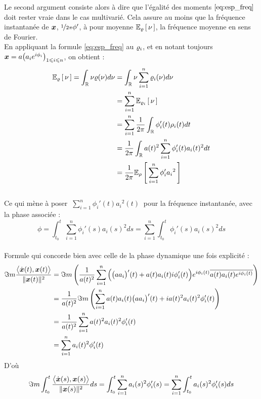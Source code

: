 Le second argument consiste alors à dire que l'égalité des moments $\eqref{eq:esp_freq}$ doit rester vraie dans le cas multivarié. Cela assure au moins que la fréquence instantanée de $\x$, $\nicefrac{1}{2\pi}\phi'$, à pour moyenne $\esp[\densis]{\nu}$, la fréquence moyenne en sens de Fourier.
\\

En appliquant la formule \eqref{eq:esp_freq} au $\densis_i$, et en notant toujours $\x = a\big(a_ie^{i\phi_i}\big)_{1\leq i\leq n}$, on obtient :
\begin{align*}
	\esp[\densis]{\nu} = \int_\R \nu\densis(\nu)d\nu &= \int_\R \nu\sum_{i=1}^n \densis_i(\nu) d\nu \\
	&= \sum_{i=1}^n\esp[\densis_i]{\nu} \\
	&= \sum_{i=1}^n\frac{1}{2\pi}\int_\R \phi_i'(t)\densit_i(t)dt \\
	&= \frac{1}{2\pi}\int_\R a(t)^2\sum_{i=1}^n\phi_i'(t)a_i(t)^2 dt 
	\\ &= \frac{1}{2\pi} \esp[\densit]{\sum_{i=1}^n \phi_i'{a_i}^2}
\end{align*}
\\
Ce qui mène à poser $\displaystyle \ \sum_{i=1}^n \phi_i'(t){a_i}^2(t)\ $ pour la fréquence instantanée, avec la phase associée :
\begin{equation}\label{eq:phas_inst_v1}
	\phi = \int_{t_0}^t \sum_{i=1}^n \phi_i'(s){a_i}(s)^2ds 
	= \sum_{i=1}^n \int_{t_0}^t \phi_i'(s){a_i}(s)^2ds 
\end{equation}
\\

Formule qui concorde bien avec celle de la phase dynamique une fois explicité :
\begin{align*}
	\Im m\frac{\big\langle \dot{\x}(t) , \x(t) \big\rangle}{\|\x(t)\|^2} &= \Im m\left( \frac{1}{a(t)^2} \sum_{i=1}^n \Big( \big(aa_i\big)'(t) +a(t)a_i(t)i\phi_i'(t)\Big)e^{i\phi_i(t)}\congu{a(t)a_i(t)e^{i\phi_i(t)}} \right) \\
	&=\frac{1}{a(t)^2}  \Im m\left( \sum_{i=1}^n a(t)a_i(t)\big(aa_i\big)'(t) +ia(t)^2a_i(t)^2\phi_i'(t) \right) \\
	&= \frac{1}{a(t)^2} \sum_{i=1}^n a(t)^2a_i(t)^2 \phi_i'(t) \\
	&= \sum_{i=1}^n a_i(t)^2 \phi_i'(t)
\end{align*}
D'où
\[\Im m\int_{t_0}^t \frac{\big\langle \dot{\x}(s) , \x(s) \big\rangle}{\|\x(s)\|^2} ds = \int_{t_0}^t \sum_{i=1}^n a_i(s)^2 \phi_i'(s) = \sum_{i=1}^n \int_{t_0}^t a_i(s)^2 \phi_i'(s)ds\]
\\



